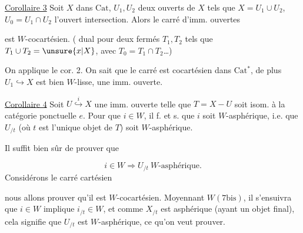 \uline{Corollaire 3}  Soit $X$ dans $\mathrm{Cat}$, $U_1,U_2$ deux ouverts de $X$ tels que $X=U_1\cup U_2$, $U_0=U_1\cap U_2$ l'ouvert intersection. Alors le carré d'imm. ouvertes


est $W$-cocartésien. ( dual pour deux fermés $T_1,T_2$ tels que $T_1\cup T_2=\unsure{x|X}$, avec $T_0=T_1\cap T_2$\ldots)

On applique le cor. 2. On sait que le carré est cocartésien dans $\mathrm{Cat}$${}^{*}$, de plus $U_1\hookrightarrow X$ est bien $W$-lisse,  une imm. ouverte.


\uline{Corollaire 4}  Soit $U\overset{i}{\hookrightarrow}X$ une imm. ouverte telle que $T=X-U$ soit isom. à la catégorie ponctuelle $e$. Pour que $i\in W$, il f. et s. que $i$ soit $W$-asphérique, i.e. que $U_{/t}$  (où $t$ est l'unique objet de $T$) soit $W$-asphérique.


Il suffit bien sûr de prouver que 

\[
i\in W\Longrightarrow U_{/t}\ \text{$W$-asphérique}.
\]
Considérons le carré cartésien


nous allons prouver qu'il est $W$-cocartésien. Moyennant $W(7\mathrm{bis})$, il s'ensuivra que $i\in W$ implique $i_{/t}\in W$, et comme $X_{/t}$ est asphérique (ayant un objet final), cela signifie que $U_{/t}$ est $W$-asphérique, ce qu'on veut prouver.

